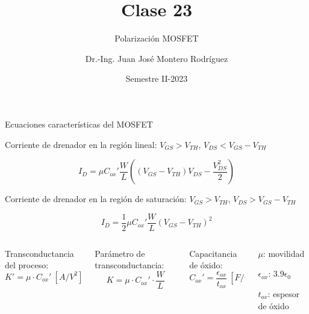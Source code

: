 \documentclass[t,aspectratio=169]{beamer}
\title{Clase 23}
\subtitle{Polarización MOSFET}
\author{Dr.-Ing. Juan José Montero Rodríguez}
\institute{Escuela de Ingeniería Electrónica}
\date{Semestre II-2023}
\begin{document}
\begin{frame}{}
\maketitle
\end{frame}


\begin{frame}{Ecuaciones características del MOSFET}

Corriente de drenador en la región lineal: $V_{GS} > V_{TH}$, $V_{DS} < V_{GS} - V_{TH}$

\begin{tcolorbox}
\[ I_D = \mu C_{ox}' \dfrac{W}{L} \left( (V_{GS} - V_{TH}) V_{DS} - \dfrac{V_{DS}^2}{2} \right) \]
\end{tcolorbox}

Corriente de drenador en la región de saturación: $V_{GS} > V_{TH}$, $ V_{DS} > V_{GS} - V_{TH} $

\begin{tcolorbox}
\[ I_D = \dfrac{1}{2} \mu {}C_{ox}' \dfrac{W}{L} (V_{GS}-V_{TH})^2 \]
\end{tcolorbox}

\begin{columns}
	\begin{column}{0.25\textwidth}
		\centering Transconductancia del proceso:
		\[ K' = \mu\cdot{}C_{ox}'\ [A/V^2] \] 
	\end{column}
	\begin{column}{0.25\textwidth}
		\centering Parámetro de transconductancia:
		\[ K = \mu\cdot{}C_{ox}' \cdot \dfrac{W}{L} \]
	\end{column}
	\begin{column}{0.25\textwidth}
        \centering Capacitancia de óxido:
        \[ C_{ox}' = \dfrac{\epsilon_{ox}}{t_{ox}}\ [F/m^2] \]
	\end{column}
	\begin{column}{0.25\textwidth}		
		$\mu$: movilidad
		
		$\epsilon_{ox}$: 3.9$\epsilon_0$
		
		$t_{ox}$: espesor de óxido
	\end{column}

\end{columns}
\end{frame}
\end{document}
